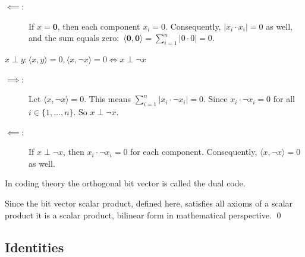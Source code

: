 \documentclass[a4paper]{article}
\newcommand{\0}{\mathbf{0}}
\newcommand{\1}{\mathbf{1}}
\begin{document}
\begin{description}
\begin{description}
\begin{description}
\item[$\impliedby $:] If $x = \0$, then each component $x_i = 0$. Consequently, $|x_i \cdot x_i| = 0$ as well,
and the sum equals zero:~$\langle \0, \0 \rangle = \sum_{i=1}^{n} |0 \cdot 0| = 0$.
\end{description}
\end{description}
\item[Orthogonality] $x \perp y : \langle x, y\rangle = 0, \langle x, \neg x \rangle = 0 \Leftrightarrow x \perp \neg x$
\begin{description}
\item[$\implies :$] Let $\langle x, \neg x \rangle = 0$. This means $\sum_{i=1}^{n} |x_i \cdot \neg x_i| = 0$.
Since $x_i \cdot \neg x_i = 0$ for all $i \in \{1, \dots, n\}$. So $x \perp \neg x$.
\item[$\impliedby $:] If $x \perp \neg x$, then $x_i \cdot \neg x_i = 0$ for each component.
Consequently, $\langle x, \neg x \rangle = 0$ as well.
\end{description}
In coding theory \cite{Lint1988} the orthogonal bit vector is called the dual code.
\end{description}

Since the bit vector scalar product, defined here,
satisfies all axioms of a scalar product it is a scalar product, bilinear form in 
mathematical perspective. \qed

\subsection{Identities}
\end{document}
